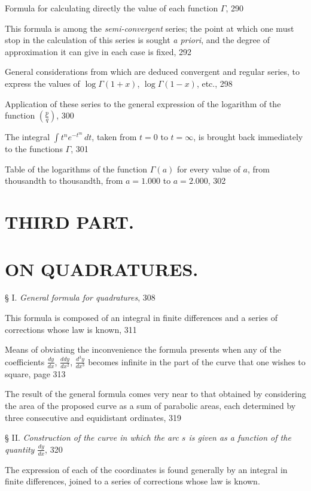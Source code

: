 \documentclass{article}
\begin{document}
Formula for calculating directly the value of each function $\Gamma$, 290

This formula is among the \emph{semi-convergent} series; the point at which one must stop in the calculation of this series is sought \emph{a priori}, and the degree of approximation it can give in each case is fixed, 292

General considerations from which are deduced convergent and regular series, to express the values of $\log\Gamma(1+x)$, $\log\Gamma(1-x)$, etc., 298

Application of these series to the general expression of the logarithm of the function $\left(\frac{p}{q}\right)$, 300

The integral $\displaystyle\int t^{n}e^{-t^{m}}\,dt$, taken from $t=0$ to $t=\infty$, is brought back immediately to the functions $\Gamma$, 301

Table of the logarithms of the function $\Gamma(a)$ for every value of $a$, from thousandth to thousandth, from $a=1.000$ to $a=2.000$, 302

\section*{THIRD PART.}

\section*{ON QUADRATURES.}

§ I. \emph{General formula for quadratures}, 308

This formula is composed of an integral in finite differences and a series of corrections whose law is known, 311

Means of obviating the inconvenience the formula presents when any of the coefficients $\frac{dy}{dx}$, $\frac{ddy}{dx^{2}}$, $\frac{d^{3}y}{dx^{3}}$ becomes infinite in the part of the curve that one wishes to square, page 313

The result of the general formula comes very near to that obtained by considering the area of the proposed curve as a sum of parabolic areas, each determined by three consecutive and equidistant ordinates, 319

§ II. \emph{Construction of the curve in which the arc $s$ is given as a function of the quantity $\frac{dy}{dx}$}, 320

The expression of each of the coordinates is found generally by an integral in finite differences, joined to a series of corrections whose law is known.
\end{document}
